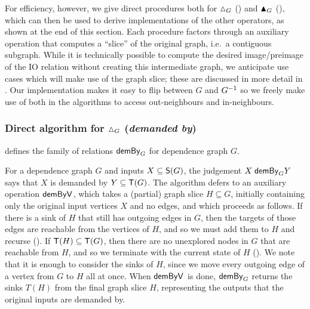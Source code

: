 For efficiency, however, we give direct procedures both for $\demandedByR_{G}$
() and $\blacktriangle_{G}$ (), which
can then be used to derive implementations of the other operators, as shown at the end of this section. Each
procedure factors through an auxiliary operation that computes a ``slice'' of the original graph, i.e.~a
contiguous subgraph. While it is technically possible to compute the desired image/preimage of the IO relation
without creating this intermediate graph, we anticipate use cases which will make use of the graph slice;
these are discussed in more detail in . Our implementation makes it easy to flip between
$G$ and $G^{-1}$ so we freely make use of both in the algorithms to access out-neighbours and
in-neighbours.

\subsubsection{Direct algorithm for $\demandedByR_{G}$ (\emph{demanded by})}
\label{sec:conjugate:algorithm:demandedBy}

\begin{definition}[$\demandedByAlg{G}$]
\label{def:conjugate:algorithm:demandedBy}
 defines the family of relations $\demandedByAlg{G}$ for dependence graph $G$.
\end{definition}
%
For a dependence graph $G$ and inputs $X \subseteq \mathsf{S}(G)$, the judgement $X\; \smash{\mathrel{\textup{\textsf{demBy}}_{G}}}
Y$ says that $X$ is demanded by $Y \subseteq \mathsf{T}(G)$. The algorithm defers to an auxiliary operation
$\mathrel{\textup{\textsf{demByV}}_{}}$, which takes a (partial) graph slice $H \subseteq G$, initially containing only the original
input vertices $X$ and no edges, and which proceeds as follows. If there is a sink of $H$ that still has
outgoing edges in $G$, then the targets of those edges are reachable from the vertices of $H$, and so we must
add them to $H$ and recurse (). If $\mathsf{T}(H) \subseteq \mathsf{T}(G)$, then there are no
unexplored nodes in $G$ that are reachable from $H$, and so we terminate with the current state of $H$
(). We note that it is enough to consider the sinks of $H$, since we move every outgoing edge
of a vertex from $G$ to $H$ all at once. When $\mathrel{\textup{\textsf{demByV}}_{}}$ is done, $\demandedByAlg{G}$ returns the sinks
$T(H)$ from the final graph slice $H$, representing the outputs that the original inputs are demanded by.

